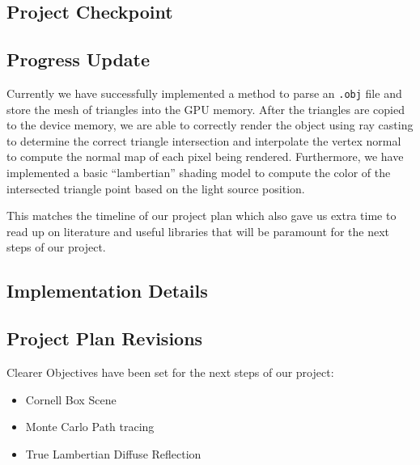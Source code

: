 \documentclass[12pt]{article}
\begin{document}
\begin{center}
    \section*{Project Checkpoint}
\end{center}


\subsection*{Progress Update}

Currently we have successfully implemented a method to parse an \texttt{.obj} file and store the
mesh of triangles into the GPU memory. After the triangles are copied to the device memory, we are
able to correctly render the object using ray casting to determine the correct triangle 
intersection and interpolate the vertex normal to compute the normal map of each pixel being
rendered. Furthermore, we have implemented a basic ``lambertian'' shading model to
compute the color of the intersected triangle point based on the light source position.

This matches the timeline of our project plan which also gave us extra time to read up on
literature and useful libraries that will be paramount for the next steps of our project.

\subsection*{Implementation Details}

\subsection*{Project Plan Revisions}

Clearer Objectives have been set for the next steps of our project:

\begin{itemize}
    \item Cornell Box Scene
    \item Monte Carlo Path tracing
    \item True Lambertian Diffuse Reflection
\end{itemize}
\end{document}
